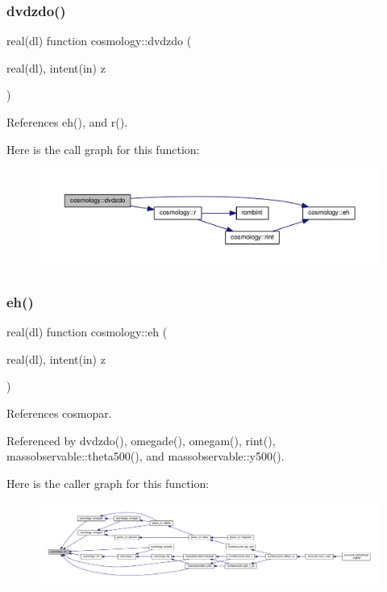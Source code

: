 \subsubsection{\texorpdfstring{dvdzdo()}{dvdzdo()}}
{\footnotesize\ttfamily real(dl) function cosmology\+::dvdzdo (\begin{DoxyParamCaption}\item[{real(dl), intent(in)}]{z }\end{DoxyParamCaption})}



References eh(), and r().

Here is the call graph for this function\+:
\nopagebreak
\begin{figure}[H]
\begin{center}
\leavevmode
\includegraphics[width=350pt]{namespacecosmology_a38a12dc082adc18d1fc8a043bd39405c_cgraph}
\end{center}
\end{figure}
\mbox{\label{namespacecosmology_af6e96fd519aaf76a5407429172288537}} 
\subsubsection{\texorpdfstring{eh()}{eh()}}
{\footnotesize\ttfamily real(dl) function cosmology\+::eh (\begin{DoxyParamCaption}\item[{real(dl), intent(in)}]{z }\end{DoxyParamCaption})}



References cosmopar.



Referenced by dvdzdo(), omegade(), omegam(), rint(), massobservable\+::theta500(), and massobservable\+::y500().

Here is the caller graph for this function\+:
\nopagebreak
\begin{figure}[H]
\begin{center}
\leavevmode
\includegraphics[width=350pt]{namespacecosmology_af6e96fd519aaf76a5407429172288537_icgraph}
\end{center}
\end{figure}
\mbox{\label{namespacecosmology_a81af36db5e915a16bc6684c70562c2cc}} 
